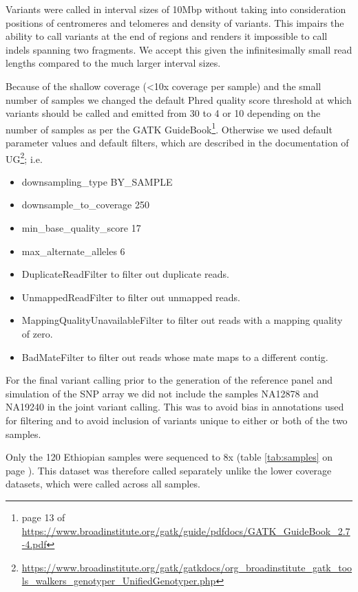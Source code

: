 

Variants were called in interval sizes of 10\gls{Mbp} without taking into consideration positions of centromeres and telomeres and density of variants. This impairs the ability to call variants at the end of regions and renders it impossible to call indels spanning two fragments. We accept this given the infinitesimally small read lengths compared to the much larger interval sizes.

Because of the shallow coverage (\textless 10x coverage per sample) and the small
number of samples we changed the default Phred quality score threshold at which variants should be called and emitted from 30 to 4 or 10 depending on the number of samples as per the \gls{GATK} GuideBook\footnote{page 13 of \url{https://www.broadinstitute.org/gatk/guide/pdfdocs/GATK_GuideBook_2.7-4.pdf}}. Otherwise we used default parameter values and default filters, which are described in the documentation of \gls{UG}\footnote{\url{https://www.broadinstitute.org/gatk/gatkdocs/org_broadinstitute_gatk_tools_walkers_genotyper_UnifiedGenotyper.php}}; i.e.
\begin{itemize}
\item \-\-downsampling\_type BY\_SAMPLE
\item \-\-downsample\_to\_coverage 250
\item \-\-min\_base\_quality\_score 17
\item \-\-max\_alternate\_alleles 6
\item DuplicateReadFilter to filter out duplicate reads.
\item UnmappedReadFilter to filter out unmapped reads.
\item MappingQualityUnavailableFilter to filter out reads with a mapping quality of zero.
\item BadMateFilter to filter out reads whose mate maps to a different contig.
\end{itemize}

For the final variant calling prior to the generation of the reference panel and simulation of the SNP array we did not include the samples NA12878 and NA19240 in the joint variant calling. This was to avoid bias in annotations used for filtering and to avoid inclusion of variants unique to either or both of the two samples.

Only the 120 Ethiopian samples were sequenced to 8x (table \ref{tab:samples} on page \pageref{tab:samples}). This dataset was therefore called separately unlike the lower coverage datasets, which were called across all samples.


